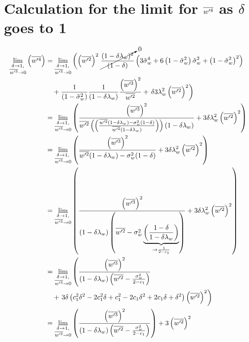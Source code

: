 \section{Calculation for the limit for \texorpdfstring{$\overline{w'^4}$}{wprime4bar} as \texorpdfstring{$\delta$}{delta} goes to 1}
\label{sec:calculation-for-the-limit-for-wprime4bar-as-delta-goes-to-1}

\begin{align}
    \label{eq:limit_wprime4_delta_to_1_calc}
    \lim_{\substack{\delta \to 1, \\ \overline{w'^3} \to 0}}\left(\overline{w'^4}\right)
    &= \lim_{\substack{\delta \to 1, \\ \overline{w'^3} \to 0}}
    \left(\left(\overline{w'^2}\right)^2\right.
    \cancelto{0}{\frac{(1-\delta \lambda_w)^2}{(1-\delta)}}
    \left(3 {\tilde{\sigma}_w}^4 + 6 \left( 1 - \tilde{\sigma}_w^2 \right) {\tilde{\sigma}_w}^2 + \left( 1 - \tilde{\sigma}_w^2 \right)^2\right) \nonumber\\
    &\quad+ \frac{1}{\left( 1 - \tilde{\sigma}_w^2 \right)} \frac{1}{(1-\delta \lambda_w)}
    \frac{\left(\overline{w'^3}\right)^2}{\overline{w'^2}}
    + \left. \delta 3 \lambda_w^2 \left(\overline{w'^2}\right)^2\right)
    \\
    &= \lim_{\substack{\delta \to 1, \\ \overline{w'^3} \to 0}}
    \left(
    \frac{
        \left(\overline{w'^3}\right)^2
    }
    {
        \overline{w'^2}
        \left(\left(\frac{\overline{w'^2} (1-\delta\lambda_w) - \sigma_w^2 (1-\delta)}{\overline{w'^2} (1-\delta\lambda_w)}\right)\right)
        (1-\delta \lambda_w)
    }
    + 3 \delta \lambda_w^2 \left(\overline{w'^2}\right)^2
    \right)
    \\
    &= \lim_{\substack{\delta \to 1, \\ \overline{w'^3} \to 0}}
    \left(
    \frac{
        \left(\overline{w'^3}\right)^2
    }{
        \overline{w'^2} (1-\delta\lambda_w) - \sigma_w^2 (1-\delta)
    }
    + 3 \delta \lambda_w^2 \left(\overline{w'^2}\right)^2
    \right)
    \\
    &= \lim_{\substack{\delta \to 1, \\ \overline{w'^3} \to 0}}
    \left(
    \frac{
        \left(\overline{w'^3}\right)^2
    }{
        (1-\delta\lambda_w)
        \left(\overline{w'^2} - \sigma_w^2 \underbrace{\left(\frac{1-\delta}{1-\delta\lambda_w}\right)}_{\to \frac{1}{2 - c_1}}\right)
    }
    + 3 \delta \lambda_w^2 \left(\overline{w'^2}\right)^2
    \right)
    \\
    &= \lim_{\substack{\delta \to 1, \\ \overline{w'^3} \to 0}}
    \left(
    \frac{
        \left(\overline{w'^3}\right)^2
    }{
        (1 - \delta\lambda_w)
        \left(\overline{w'^2} - \frac{\sigma_w^2}{2 - c_1}\right)
    }
    \right.
    \nonumber\\
    &\quad+
    \left.3 \delta \left(c_1^2\delta^2 - 2c_1^2\delta + c_1^2 - 2c_1\delta^2 + 2c_1\delta + \delta^2\right) \left(\overline{w'^2}\right)^2
    \right)
    \\
    &= \lim_{\substack{\delta \to 1, \\ \overline{w'^3} \to 0}}
    \left(
    \frac{
        \left(\overline{w'^3}\right)^2
    }{
        (1 - \delta\lambda_w)
        \left(\overline{w'^2} - \frac{\sigma_w^2}{2 - c_1}\right)
    }
    \right)
    + 3 \left(\overline{w'^2}\right)^2
\end{align}
